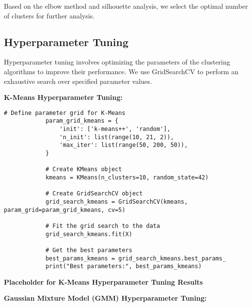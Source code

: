         Based on the elbow method and silhouette analysis, we select the optimal number of clusters for further analysis.
            
    \subsection{Hyperparameter Tuning}
    
        Hyperparameter tuning involves optimizing the parameters of the clustering algorithms to improve their performance. We use GridSearchCV to perform an exhaustive search over specified parameter values.

        \textbf{K-Means Hyperparameter Tuning:}
        
        \vspace{0.5em}

        \begin{lstlisting}[caption={Grid Search for k-Means Clustering}, label={lst:grid_search_kmeans}]
            # Define parameter grid for K-Means
            param_grid_kmeans = {
                'init': ['k-means++', 'random'],
                'n_init': list(range(10, 21, 2)),
                'max_iter': list(range(50, 200, 50)),
            }
            
            # Create KMeans object
            kmeans = KMeans(n_clusters=10, random_state=42)
            
            # Create GridSearchCV object
            grid_search_kmeans = GridSearchCV(kmeans, param_grid=param_grid_kmeans, cv=5)
            
            # Fit the grid search to the data
            grid_search_kmeans.fit(X)
            
            # Get the best parameters
            best_params_kmeans = grid_search_kmeans.best_params_
            print("Best parameters:", best_params_kmeans)
        \end{lstlisting}

        \textbf{Placeholder for K-Means Hyperparameter Tuning Results}

        \textbf{Gaussian Mixture Model (GMM) Hyperparameter Tuning:}
        
        \vspace{0.5em}

